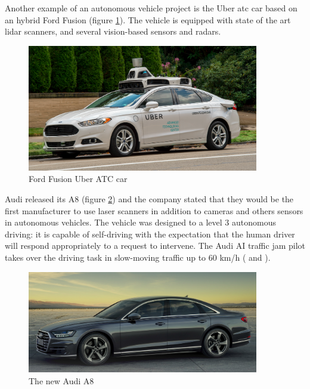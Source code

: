Another example of an autonomous vehicle project is the Uber \gls{atc} car based on an hybrid Ford Fusion (figure \ref{fig:uber}). The vehicle is equipped with state of the art \gls{lidar} scanners, and several vision-based sensors and radars.

\begin{figure}[htp]
	
	\centering
	\includegraphics[width=0.9\textwidth]{capstate/imgs/uber}
	
	\caption{Ford Fusion Uber ATC car}
	\label{fig:uber}
	
\end{figure}

Audi released its A8 (figure \ref{fig:audi}) and the company stated that they would be the first manufacturer to use laser scanners in addition to cameras and others sensors in autonomous vehicles. The vehicle was designed to a level 3 autonomous driving: it is capable of self-driving with the expectation that the human driver will respond appropriately to a request to intervene. The Audi AI traffic jam pilot takes over the driving task in slow-moving traffic up to 60 km/h (\cite{AudiMediaCenter} and \cite{AndreasHerrmannWalterBrenner2018}).

\begin{figure}[htp]
	
	\centering
	\includegraphics[width=0.9\textwidth]{capstate/imgs/audi}
	
	\caption{The new Audi A8}
	\label{fig:audi}
	
\end{figure}

